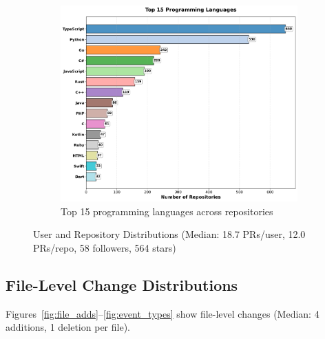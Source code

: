\documentclass[11pt]{article}
\begin{document}
\begin{figure}[H]
\begin{subfigure}[b]{0.9\textwidth}
\centering
\includegraphics[width=\textwidth]{figures_individual/24_programming_languages_barplot.png}
\caption{Top 15 programming languages across repositories}
\label{fig:languages}
\end{subfigure}

\caption{User and Repository Distributions (Median: 18.7 PRs/user, 12.0 PRs/repo, 58 followers, 564 stars)}
\label{fig:user_repo_all}
\end{figure}

\subsection{File-Level Change Distributions}

Figures~\ref{fig:file_adds}--\ref{fig:event_types} show file-level changes (Median: 4 additions, 1 deletion per file).
\end{document}
